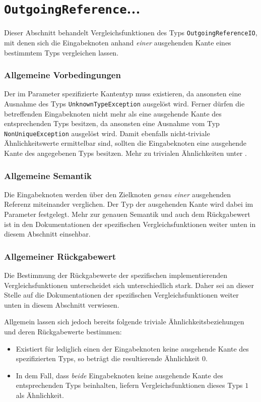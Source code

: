 %
%

\section{\texttt{OutgoingReference}...}
\label{strct:spec:outref}
Dieser Abschnitt behandelt Vergleichsfunktionen des Typs \texttt{OutgoingReferenceIO}, mit denen sich die Eingabeknoten anhand \emph{einer} ausgehenden Kante eines bestimmtem Typs vergleichen lassen.

\subsubsection*{Allgemeine Vorbedingungen}
Der im Parameter spezifizierte Kantentyp muss existieren, da ansonsten eine Ausnahme des Typs \texttt{UnknownTypeException} ausgelöst wird. Ferner dürfen die betreffenden Eingabeknoten nicht mehr als eine ausgehende Kante des entsprechenden Typs besitzen, da ansonsten eine Ausnahme vom Typ \texttt{NonUniqueException} ausgelöst wird. Damit ebenfalls nicht-triviale Ähnlichkeitswerte ermittelbar sind, sollten die Eingabeknoten eine ausgehende Kante des angegebenen Typs besitzen. Mehr zu trivialen Ähnlichkeiten unter .

\subsubsection*{Allgemeine Semantik}
Die Eingabeknoten werden über den Zielknoten \emph{genau einer} ausgehenden Referenz miteinander verglichen. Der Typ der ausgehenden Kante wird dabei im Parameter festgelegt. Mehr zur genauen Semantik und auch dem Rückgabewert ist in den Dokumentationen der spezifischen Vergleichsfunktionen weiter unten in diesem Abschnitt einsehbar.

\subsubsection*{Allgemeiner Rückgabewert}
Die Bestimmung der Rückgabewerte der spezifischen implementierenden Vergleichsfunktionen unterscheidet sich unterschiedlich stark. Daher sei an dieser Stelle auf die Dokumentationen der spezifischen Vergleichsfunktionen weiter unten in diesem Abschnitt verwiesen.

Allgemein lassen sich jedoch bereits folgende triviale Ähnlichkeitsbeziehungen und deren Rückgabewerte bestimmen:
\begin{itemize}
	\item Existiert für lediglich einen der Eingabeknoten keine ausgehende Kante des spezifizierten Typs, so beträgt die resultierende Ähnlichkeit $0$.
	\item In dem Fall, dass \emph{beide} Eingabeknoten keine ausgehende Kante des entsprechenden Typs beinhalten, liefern Vergleichsfunktionen dieses Typs $1$ als Ähnlichkeit.
\end{itemize}

